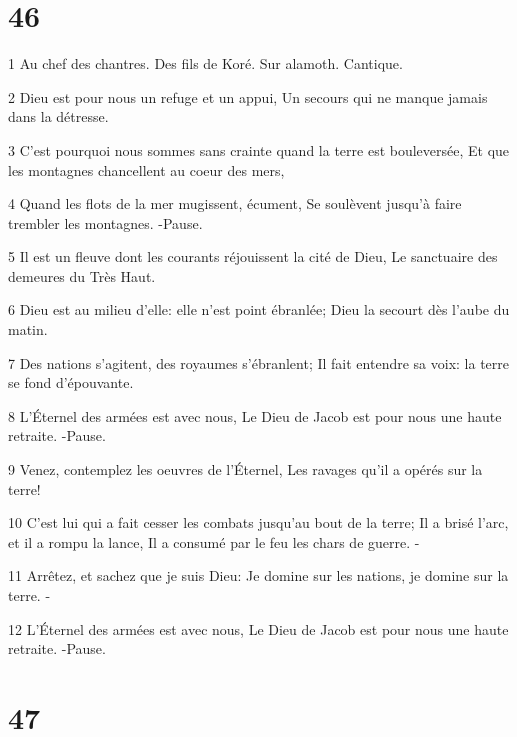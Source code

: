 \chapter{46}

\par 1 Au chef des chantres. Des fils de Koré. Sur alamoth. Cantique.
\par 2 Dieu est pour nous un refuge et un appui, Un secours qui ne manque jamais dans la détresse.
\par 3 C'est pourquoi nous sommes sans crainte quand la terre est bouleversée, Et que les montagnes chancellent au coeur des mers,
\par 4 Quand les flots de la mer mugissent, écument, Se soulèvent jusqu'à faire trembler les montagnes. -Pause.
\par 5 Il est un fleuve dont les courants réjouissent la cité de Dieu, Le sanctuaire des demeures du Très Haut.
\par 6 Dieu est au milieu d'elle: elle n'est point ébranlée; Dieu la secourt dès l'aube du matin.
\par 7 Des nations s'agitent, des royaumes s'ébranlent; Il fait entendre sa voix: la terre se fond d'épouvante.
\par 8 L'Éternel des armées est avec nous, Le Dieu de Jacob est pour nous une haute retraite. -Pause.
\par 9 Venez, contemplez les oeuvres de l'Éternel, Les ravages qu'il a opérés sur la terre!
\par 10 C'est lui qui a fait cesser les combats jusqu'au bout de la terre; Il a brisé l'arc, et il a rompu la lance, Il a consumé par le feu les chars de guerre. -
\par 11 Arrêtez, et sachez que je suis Dieu: Je domine sur les nations, je domine sur la terre. -
\par 12 L'Éternel des armées est avec nous, Le Dieu de Jacob est pour nous une haute retraite. -Pause.

\chapter{47}

